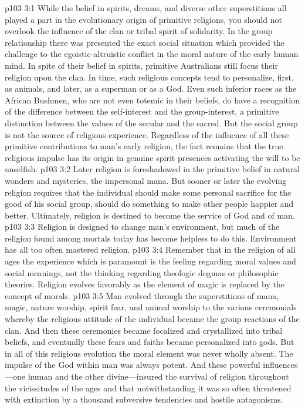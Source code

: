 \vs p103 3:1 While the belief in spirits, dreams, and diverse other superstitions all played a part in the evolutionary origin of primitive religions, you should not overlook the influence of the clan or tribal spirit of solidarity. In the group relationship there was presented the exact social situation which provided the challenge to the egoistic\hyp{}altruistic conflict in the moral nature of the early human mind. In spite of their belief in spirits, primitive Australians still focus their religion upon the clan. In time, such religious concepts tend to personalize, first, as animals, and later, as a superman or as a God. Even such inferior races as the African Bushmen, who are not even totemic in their beliefs, do have a recognition of the difference between the self\hyp{}interest and the group\hyp{}interest, a primitive distinction between the values of the secular and the sacred. But the social group is not the source of religious experience. Regardless of the influence of all these primitive contributions to man’s early religion, the fact remains that the true religious impulse has its origin in genuine spirit presences activating the will to be unselfish.
\pc \vs p103 3:2 Later religion is foreshadowed in the primitive belief in natural wonders and mysteries, the impersonal mana. But sooner or later the evolving religion requires that the individual should make some personal sacrifice for the good of his social group, should do something to make other people happier and better. Ultimately, religion is destined to become the service of God and of man.
\vs p103 3:3 Religion is designed to change man’s environment, but much of the religion found among mortals today has become helpless to do this. Environment has all too often mastered religion.
\pc \vs p103 3:4 Remember that in the religion of all ages the experience which is paramount is the feeling regarding moral values and social meanings, not the thinking regarding theologic dogmas or philosophic theories. Religion evolves favorably as the element of magic is replaced by the concept of morals.
\vs p103 3:5 Man evolved through the superstitions of mana, magic, nature worship, spirit fear, and animal worship to the various ceremonials whereby the religious attitude of the individual became the group reactions of the clan. And then these ceremonies became focalized and crystallized into tribal beliefs, and eventually these fears and faiths became personalized into gods. But in all of this religious evolution the moral element was never wholly absent. The impulse of the God within man was always potent. And these powerful influences---one human and the other divine---insured the survival of religion throughout the vicissitudes of the ages and that notwithstanding it was so often threatened with extinction by a thousand subversive tendencies and hostile antagonisms.
